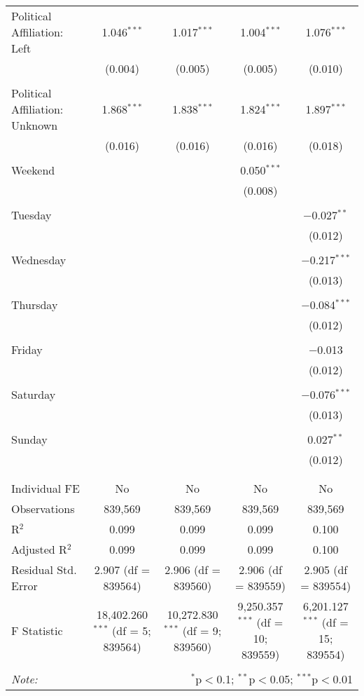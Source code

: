 \documentclass[
]{article}
\begin{document}
\begin{table}[!htbp]
{\begin{tabular}{@{\extracolsep{5pt}}lcccc}
 Political Affiliation: Left & 1.046$^{***}$ & 1.017$^{***}$ & 1.004$^{***}$ & 1.076$^{***}$ \\ 
  & (0.004) & (0.005) & (0.005) & (0.010) \\ 
  & & & & \\ 
 Political Affiliation: Unknown & 1.868$^{***}$ & 1.838$^{***}$ & 1.824$^{***}$ & 1.897$^{***}$ \\ 
  & (0.016) & (0.016) & (0.016) & (0.018) \\ 
  & & & & \\ 
 Weekend &  &  & 0.050$^{***}$ &  \\ 
  &  &  & (0.008) &  \\ 
  & & & & \\ 
 Tuesday &  &  &  & $-$0.027$^{**}$ \\ 
  &  &  &  & (0.012) \\ 
  & & & & \\ 
 Wednesday &  &  &  & $-$0.217$^{***}$ \\ 
  &  &  &  & (0.013) \\ 
  & & & & \\ 
 Thursday &  &  &  & $-$0.084$^{***}$ \\ 
  &  &  &  & (0.012) \\ 
  & & & & \\ 
 Friday &  &  &  & $-$0.013 \\ 
  &  &  &  & (0.012) \\ 
  & & & & \\ 
 Saturday &  &  &  & $-$0.076$^{***}$ \\ 
  &  &  &  & (0.013) \\ 
  & & & & \\ 
 Sunday &  &  &  & 0.027$^{**}$ \\ 
  &  &  &  & (0.012) \\ 
  & & & & \\ 
\hline \\[-1.8ex] 
Individual FE & No & No & No & No \\ 
Observations & 839,569 & 839,569 & 839,569 & 839,569 \\ 
R$^{2}$ & 0.099 & 0.099 & 0.099 & 0.100 \\ 
Adjusted R$^{2}$ & 0.099 & 0.099 & 0.099 & 0.100 \\ 
Residual Std. Error & 2.907 (df = 839564) & 2.906 (df = 839560) & 2.906 (df = 839559) & 2.905 (df = 839554) \\ 
F Statistic & 18,402.260$^{***}$ (df = 5; 839564) & 10,272.830$^{***}$ (df = 9; 839560) & 9,250.357$^{***}$ (df = 10; 839559) & 6,201.127$^{***}$ (df = 15; 839554) \\ 
\hline 
\hline \\[-1.8ex] 
\textit{Note:}  & \multicolumn{4}{r}{$^{*}$p$<$0.1; $^{**}$p$<$0.05; $^{***}$p$<$0.01} \\ 
\end{tabular}
} 
\end{table} 
\newpage
\end{document}
